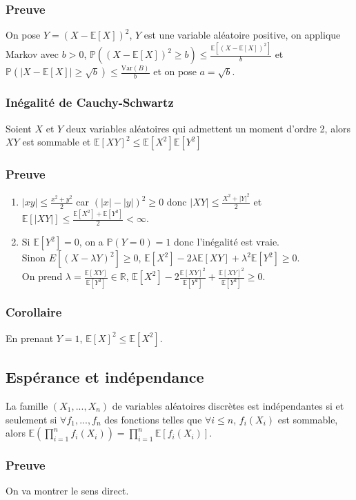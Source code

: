 \documentclass[a4paper,10pt]{book} %
\newcommand{\R}{\mathbb{R}}
\newcommand{\E}{\mathbb{E}} %
\renewcommand{\P}{\mathbb{P}} %
\newcommand\abs[1]{\left|#1\right|}
\newcommand{\Var}{\mathrm{Var}} %
\begin{document}
\subsubsection{Preuve}
On pose $Y = (X-\E[X])^2$, $Y$ est une variable aléatoire positive, on applique Markov avec $b>0$, $\P((X-\E[X])^2\geq b)\leq \frac{\E[(X-\E[X])^2]}{b}$ et $\P(\abs{X-\E[X]}\geq \sqrt{b})\leq \frac{\Var(B)}{b}$ et on pose $a = \sqrt{b}$.

\subsubsection{Inégalité de Cauchy-Schwartz}
Soient $X$ et $Y$ deux variables aléatoires qui admettent un moment d'ordre 2, alors $XY$ est sommable et $\E[XY]^2\leq \E[X^2]\E[Y^2]$

\subsubsection{Preuve}
\begin{enumerate}
\item $\abs{xy}\leq \frac{x^2+y^2}{2}$ car $(\abs{x}-\abs{y})^2\geq 0$ donc $\abs{XY}\leq \frac{X^2+\abs{Y}^2}{2}$ et $\E[\abs{XY}]\leq \frac{\E[X^2]+\E[Y^2]}{2}<\infty$.\\
\item Si $\E[Y^2]=0$, on a $\P(Y=0)=1$ donc l'inégalité est vraie.\\
Sinon $E[(X-\lambda Y)^2]\geq 0$, $\E[X^2]-2\lambda\E[XY]+\lambda^2\E[Y^2]\geq 0$.\\
On prend $\lambda = \frac{\E[XY]}{\E[Y^2]}\in \R$, $\E[X^2]-2\frac{\E[XY]^2}{\E[Y^2]}+\frac{\E[XY]^2}{\E[Y^2]}\geq 0$.
\end{enumerate}

\subsubsection{Corollaire}
En prenant $Y = 1$, $\E[X]^2\leq \E[X^2]$.

\subsection{Espérance et indépendance}
La famille $(X_1,...,X_n)$ de variables aléatoires discrètes est indépendantes si et seulement si $\forall f_1,...,f_n$ des fonctions telles que $\forall i\leq n$, $f_i(X_i)$ est sommable, alors $\E(\prod_{i=1}^nf_i(X_i))=\prod_{i=1}^n\E[f_i(X_i)]$.

\subsubsection{Preuve}
On va montrer le sens direct.\\
\end{document}
